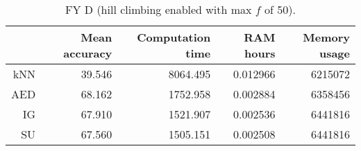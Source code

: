 \begin{table}[h]
\centering
\begin{tabular}{r|rrrr}
    & Mean accuracy & Computation time & RAM hours & Memory usage \\ \hline
kNN & 39.546                   & 8064.495         & 0.012966  & 6215072      \\
AED & 68.162                   & 1752.958         & 0.002884  & 6358456      \\
IG  & 67.910                   & 1521.907         & 0.002536  & 6441816      \\
SU  & 67.560                   & 1505.151         & 0.002508  & 6441816    
\end{tabular}
\caption{FY D (hill climbing enabled with max $f$ of 50).}
\label{Table:FY_D_H}
\end{table}